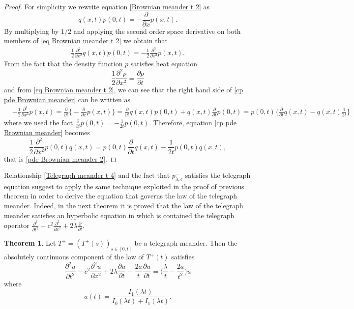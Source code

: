 \documentclass{article}
\theoremstyle{definition}
\newtheorem{theorem}{Theorem}[section]
\numberwithin{equation}{section}
\begin{document}
\begin{proof}
For simplicity we rewrite equation \eqref{Brownian meander t 2} as
\begin{equation}\label{eq Brownian meander t 2}
q(x,t)p(0,t) = -\frac{\partial}{\partial x}p(x,t).
\end{equation}
By multiplying by $1/2$ and applying the second order space derivative on both members of \eqref{eq Brownian meander t 2} we obtain that
\begin{align}\label{cp pde Brownian meander}
\frac{1}{2}\frac{\partial^2}{\partial x^2}q(x,t)p(0,t) = -\frac{1}{2}\frac{\partial^3}{\partial x^3}p(x,t).
\end{align}
From the fact that the density function $p$ satisfies heat equation
\begin{equation}\label{Heat equation}
\frac{1}{2}\frac{\partial^2 p}{\partial x^2} = \frac{\partial p}{\partial t}
\end{equation}
and from \eqref{eq Brownian meander t 2}, we can see that the right hand side of \eqref{cp pde Brownian meander} can be written as 
\begin{align*}
&-\frac{1}{2}\frac{\partial^3}{\partial x^3}p(x,t) = \frac{\partial}{\partial t}\Big\{-\frac{\partial}{\partial x}p(x,t)\Big\} =\frac{\partial}{\partial t}q(x,t)p(0,t)+q(x,t)\frac{\partial}{\partial t}p(0,t) =p(0,t)\Big\{\frac{\partial}{\partial t}q(x,t)-q(x,t)\frac{1}{2t}\Big\}
\end{align*}
where we used the fact $\frac{\partial}{\partial t}p(0,t) = -\frac{1}{2 t}p(0,t)$. Therefore, equation \eqref{cp pde Brownian meander} becomes 
\begin{equation*}
\frac{1}{2}\frac{\partial^2}{\partial x^2}p(0,t)q(x,t) =  p(0,t)\frac{\partial }{\partial t}q(x,t)-\frac{1}{2t}p(0,t)q(x,t),
\end{equation*}
that is \eqref{pde Brownian meander 2}.
\end{proof}
Relationship \eqref{Telegraph meander t 4} and the fact that $p_{\lambda,c}^{-}$ satisfies the telegraph equation suggest to apply the same technique exploited in the proof of previous theorem in order to derive the equation that governs the law of the telegraph meander. Indeed, in the next theorem it is proved that the law of the telegraph meander satisfies an hyperbolic equation in which is contained the telegraph operator $\frac{\partial^2}{\partial t^2}-c^2\frac{\partial^2}{\partial x^2}+2\lambda\frac{\partial}{\partial t}$.
\begin{theorem}
Let $T^+ = (T^+(s))_{s \in [0,t]}$ be a telegraph meander. Then the absolutely continuous component of the law of $T^+(t)$ satisfies 
\begin{equation}\label{pde telegraph meander}
\frac{\partial^2u}{\partial t^2}-c^2\frac{\partial^2 u}{\partial x^2}+2\lambda\frac{\partial u}{\partial  t}-\frac{2a}{t}\frac{\partial u}{\partial t}=\Big(\frac{\lambda}{t}-\frac{2a}{ t^2}\Big)u
\end{equation}
where 
\begin{equation}
a(t) = \frac{I_1(\lambda t)}{I_0(\lambda t)+I_1(\lambda t)}.
\end{equation}
\end{theorem}
\end{document}
